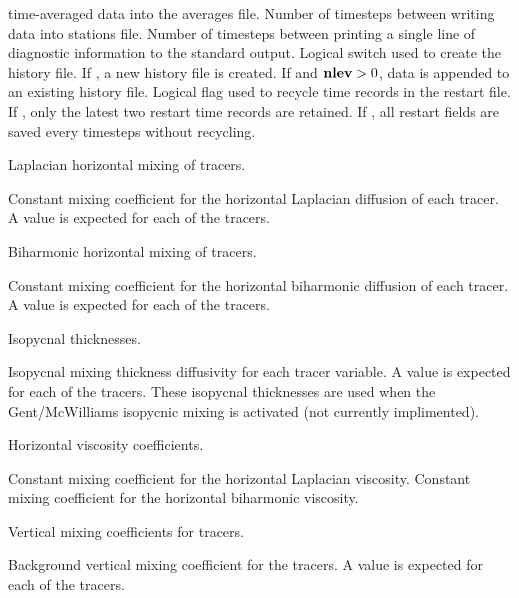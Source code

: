 \begin{klist}
\begin{klist}
     time-averaged data into the averages file.
             Number of timesteps between writing data into
     stations file.
            Number of timesteps between printing a single
     line of diagnostic information to the standard output.
          Logical switch used to create the history
     file.  If , a new history file is created.  If
      and $\mbox{\bf nlev} > 0$, data is appended to an
     existing history file.
           Logical flag used to recycle time records in
     the restart file. If , only the latest two restart
     time records are retained.  If , all restart
     fields are saved every  timesteps without recycling.
     \end{klist}
      Laplacian horizontal mixing of tracers.
     \begin{klist}
            Constant mixing
     coefficient for the horizontal Laplacian diffusion of each tracer.
     A value is expected for each of the  tracers.
     \end{klist}
      Biharmonic horizontal mixing of tracers.
     \begin{klist}
            Constant mixing
     coefficient for the horizontal biharmonic diffusion of each tracer.
     A value is expected for each of the  tracers.
     \end{klist}
      Isopycnal thicknesses.
     \begin{klist}
        Isopycnal mixing thickness diffusivity for
     each tracer variable. A value is expected for each of the
      tracers. These isopycnal thicknesses are used when the
     Gent/McWilliams isopycnic mixing is activated (not currently
     implimented).
     \end{klist}
      Horizontal viscosity coefficients.
     \begin{klist}
           Constant mixing coefficient for the horizontal
     Laplacian viscosity.
           Constant mixing coefficient for the horizontal
     biharmonic viscosity.
     \end{klist}
      Vertical mixing coefficients for tracers.
     \begin{klist}
         Background vertical mixing coefficient
     for the tracers.
     A value is expected for each of the  tracers.

\end{klist}
\end{klist}
